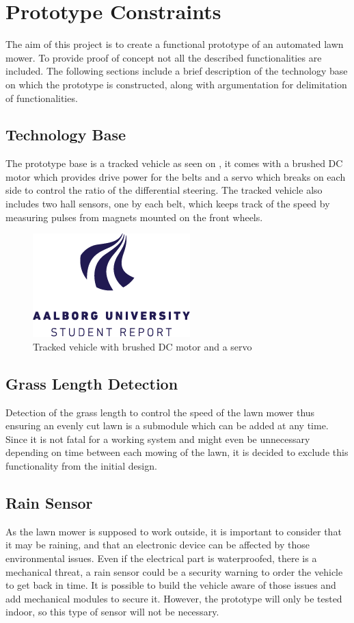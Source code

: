 \section{Prototype Constraints}
The aim of this project is to create a functional prototype of an automated lawn mower. To provide proof of concept not all the described functionalities are included. The following sections include a brief description of the technology base on which the prototype is constructed, along with argumentation for delimitation of functionalities.

\subsection{Technology Base}
The prototype base is a tracked vehicle as seen on , it comes with a brushed DC motor which provides drive power for the belts and a servo which breaks on each side to control the ratio of the differential steering. The tracked vehicle also includes two hall sensors, one by each belt, which keeps track of the speed by measuring pulses from magnets mounted on the front wheels.

\begin{figure}[H]
	\centering
	\includegraphics[scale=.7]{figures/aaulogo-en}
	\flushleft
	\caption{Tracked vehicle with brushed DC motor and a servo}
	\label{TrackedVehicle}
\end{figure}

\subsection{Grass Length Detection}
Detection of the grass length to control the speed of the lawn mower thus ensuring an evenly cut lawn is a submodule which can be added at any time. Since it is not fatal for a working system and might even be unnecessary depending on time between each mowing of the lawn, it is decided to exclude this functionality from the initial design.

\subsection{Rain Sensor}
As the lawn mower is supposed to work outside, it is important to consider that it may be raining, and that an electronic device can be affected by those environmental issues. Even if the electrical part is waterproofed, there is a mechanical threat, a rain sensor could be a security warning to order the vehicle to get back in time.
It is possible to build the vehicle aware of those issues and add mechanical modules to secure it. However, the prototype will only be tested indoor, so this type of sensor will not be necessary.


